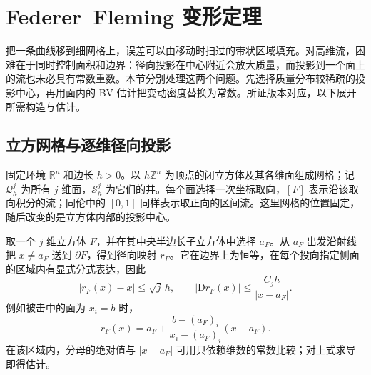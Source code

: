 
% 
% 

\section{Federer–Fleming 变形定理}
\label{g3:sec:2204}
把一条曲线移到细网格上，误差可以由移动时扫过的带状区域填充。对高维流，困难在于同时控制面积和边界：径向投影在中心附近会放大质量，而投影到一个面上的流也未必具有常数重数。本节分别处理这两个问题。先选择质量分布较稀疏的投影中心，再用面内的 BV 估计把变动密度替换为常数。所证版本对应\cite[第29节，定理29.1、推论29.3及证明，第163--177页]{Simon1983}，以下展开所需构造与估计。

\subsection{立方网格与逐维径向投影}
\label{g3:subsec:2204:01}
固定环境 \(\mathbb R^n\) 和边长 \(h>0\)。以 \(h\mathbb Z^n\) 为顶点的闭立方体及其各维面组成网格；记 \(\mathcal Q_h^j\) 为所有 \(j\) 维面，\(\mathcal S_h^j\) 为它们的并。每个面选择一次坐标取向，\([F]\) 表示沿该取向积分的流；同伦中的 \([0,1]\) 同样表示取正向的区间流。这里网格的位置固定，随后改变的是立方体内部的投影中心。

取一个 \(j\) 维立方体 \(F\)，并在其中央半边长子立方体中选择 \(a_F\)。从 \(a_F\) 出发沿射线把 \(x\ne a_F\) 送到 \(\partial F\)，得到径向映射 \(r_F\)。它在边界上为恒等，在每个投向指定侧面的区域内有显式分式表达，因此
\[
	|r_F(x)-x|\le\sqrt j\,h,\qquad
	|\mathrm Dr_F(x)|\le \frac{C_jh}{|x-a_F|}.
\]
例如被击中的面为 \(x_i=b\) 时，
\[
	r_F(x)=a_F+\frac{b-(a_F)_i}{x_i-(a_F)_i}(x-a_F).
\]
在该区域内，分母的绝对值与 \(|x-a_F|\) 可用只依赖维数的常数比较；对上式求导即得估计。

